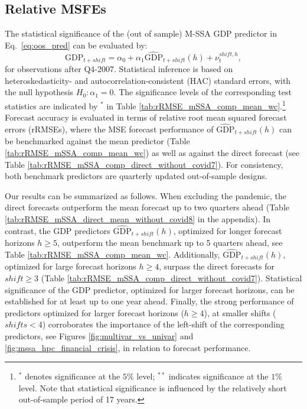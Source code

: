 \documentclass[11pt,a4paper]{article}
\begin{document}
\subsection*{Relative MSFEs}\label{sec:oosp}

The statistical significance of the (out of sample) M-SSA GDP predictor in Eq.~\eqref{eq:oos_pred} can be evaluated by:
\begin{equation}\label{eq:eq_gdp_pred}
\textrm{GDP}_{t+shift}=\alpha_0+\alpha_1\widehat{\textrm{GDP}}_{t+shift}(h)+\nu_{t}^{shift,h},
\end{equation}
for observations after Q4-2007. Statistical inference is based on heteroskedasticity- and autocorrelation-consistent (HAC) standard errors, with the null hypothesis $H_0 : \alpha_1 =0$. The significance levels of the corresponding test statistics are indicated by $^{*}$ in Table \ref{tab:rRMSE_mSSA_comp_mean_wc}.\footnote{$^{*}$ denotes significance at the $5\%$ level; $^{**}$ indicates significance at the $1\%$ level. Note that statistical significance is influenced by the relatively short out-of-sample period of 17 years.} Forecast accuracy is evaluated in terms of relative root mean squared forecast errors (rRMSEs), where the MSE forecast performance of $\widehat{\textrm{GDP}}_{t+shift}(h)$ can be benchmarked against the mean predictor (Table \ref{tab:rRMSE_mSSA_comp_mean_wc}) as well as against the direct forecast (see Table \ref{tab:rRMSE_mSSA_comp_direct_without_covid7}). For consistency, both benchmark predictors are quarterly updated out-of-sample designs.

Our results can be summarized as follows. When excluding the pandemic, the direct forecasts outperform the mean forecast up to two quarters ahead (Table \ref{tab:rRMSE_mSSA_direct_mean_without_covid8} in the appendix). %
In contrast, the GDP predictors $\widehat{\textrm{GDP}}_{t+shift}(h)$, optimized for longer forecast horizons $h\geq 5$, outperform the mean benchmark up to 5 quarters ahead, see Table \ref{tab:rRMSE_mSSA_comp_mean_wc}. Additionally, $\widehat{\textrm{GDP}}_{t+shift}(h)$, optimized for large forecast horizons $h\geq 4$, surpass the direct forecasts for $shift\geq 3$ (Table \ref{tab:rRMSE_mSSA_comp_direct_without_covid7}). Statistical significance of the GDP predictor, optimized for larger forecast horizons, can be established for at least up to one year ahead. Finally, the strong performance of predictors optimized for larger forecast horizons ($h\geq 4$), at smaller shifts ($shifts< 4$) corroborates the importance of the left-shift of the corresponding predictors, see Figures \ref{fig:multivar_vs_univar} and \ref{fig:mssa_hpc_financial_crisis}, in relation to forecast performance.
\end{document}
